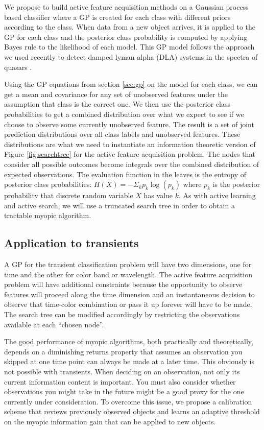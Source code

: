 \documentclass[prd,nofootbib,floatfix,11pt,tightenlines,nofootinbib]{revtex4}
\begin{document}
We propose to build active feature acquisition methods on a Gaussian
process based classifier where a GP is created for each class with
different priors according to the class.  When data from a new object
arrives, it is applied to the GP for each class and the posterior class
probability is computed by applying Bayes rule to the likelihood of each
model.  This GP model follows the approach we used recently to detect
damped lyman alpha (DLA) systems in the spectra of quasars
\cite{Garnett12a}.

Using the GP equations from section \ref{sec:gp} on the model for each
class, we can get a mean and covariance for any set of unobserved features
under the assumption that class is the correct one.  We then use the
posterior class probabilities to get a combined distribution over what we
expect to see if we choose to observe some currently unobserved feature.
The result is a set of joint prediction distributions over all class labels
and unobserved features.  These distributions are what we need to
instantiate an information theoretic version of Figure \ref{fig:searchtree}
for the active feature acquisition problem.  The nodes that consider all
possible outcomes become integrals over the combined distribution of
expected observations.  The evaluation function in the leaves is the
entropy of posterior class probabilities: $H(X) = -\Sigma_k p_k \log(p_k)$
where $p_k$ is the posterior probability that discrete random variable $X$
has value $k$.  As with active learning and active search, we will use a
truncated search tree in order to obtain a tractable myopic algorithm.

\subsection{Application to transients}

A GP for the transient classification problem will have two dimensions, one
for time and the other for color band or wavelength.  The active feature
acquisition problem will have additional constraints because the
opportunity to observe features will proceed along the time dimension and
an instantaneous decision to observe that time-color combination or pass it
up forever will have to be made.  The search tree can be modified
accordingly by restricting the observations available at each ``chosen
node''.

The good performance of myopic algorithms, both practically and
theoretically, depends on a diminishing returns property that assumes an
observation you skipped at one time point can always be made at a later
time.  This obviously is not possible with transients.  When deciding on an
observation, not only its current information content is important.  You
must also consider whether observations you might take in the future might
be a good proxy for the one currently under consideration.  To overcome
this issue, we propose a calibration scheme that reviews previously
observed objects and learns an adaptive threshold on the myopic information
gain that can be applied to new objects.
\end{document}
